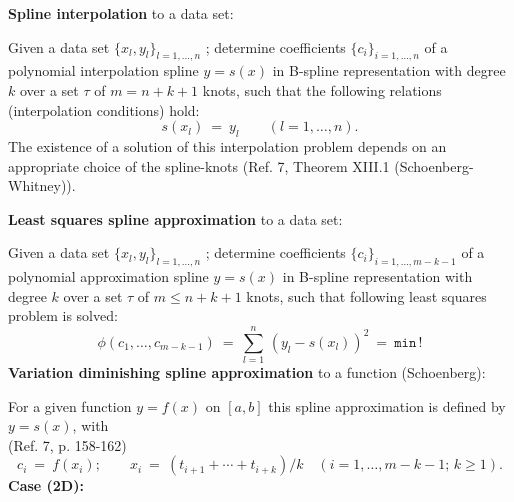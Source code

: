 \par
{\bf Spline interpolation} to a data set:
\par
Given a data set $\{x_l,y_l\}_{l=1, \ldots ,n}$ ; determine
coefficients $\{c_i\}_{i=1, \ldots ,n}$ of a polynomial interpolation
spline $y = s(x)$ in B-spline representation with degree $k$ over a set
$\tau$ of $m=n+k+1$ knots, such that the following relations
(interpolation conditions) hold:
$$s(x_l) \ = \ y_l \qquad (l=1, \ldots ,n).$$
The existence of a solution of this interpolation problem
depends on an appropriate choice of the spline-knots (Ref. 7,
Theorem XIII.1 (Schoenberg-Whitney)).
\par
{\bf Least squares spline approximation} to a data set:
\par
Given a data set $\{x_l,y_l\}_{l=1, \ldots ,n}$ ; determine
coefficients $\{c_i\}_{i=1, \ldots ,m-k-1}$ of a polynomial approximation
spline $y = s(x)$ in B-spline representation with degree $k$ over a set
$\tau$ of $m \le n+k+1$ knots, such that following least squares
 problem is solved:
$$\phi (c_1, \ldots ,c_{m-k-1}) \ = \ \sum_{l=1}^{n}\,
  \left(y_l - s(x_l)\right)^2 \ = \ \mathtt{min \,!}$$
\newpage
{\bf Variation diminishing spline approximation} to a function
(Schoenberg):
\par
For a given function $y = f(x)$ on $[a,b]$ this spline approximation is
defined by $y = s(x)$, with \\
(Ref. 7, p. 158-162)
$$c_i \ = \ f(x_i); \qquad x_i \ = \ (t_{i+1}+\cdots+t_{i+k})/k
\quad (i=1,\ldots,m-k-1;\,k \ge 1). $$
{\bf Case (2D):}
